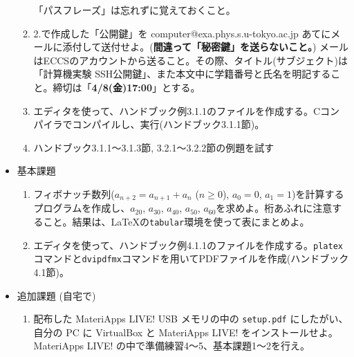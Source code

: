 \documentclass[11pt]{jarticle}
\begin{document}
\begin{itemize}
\begin{enumerate}
    「パスフレーズ」は忘れずに覚えておくこと。
  \item 2.で作成した「公開鍵」を computer@exa.phys.s.u-tokyo.ac.jp あてにメールに添付して送付せよ。({\bf 間違って「秘密鍵」を送らないこと。}) メールはECCSのアカウントから送ること。その際、タイトル(サブジェクト)は「計算機実験 SSH公開鍵」、また本文中に学籍番号と氏名を明記すること。締切は「{\bf 4/8(金)17:00}」とする。
  \item エディタを使って、ハンドブック例3.1.1のファイルを作成する。Cコンパイラでコンパイルし、実行(ハンドブック3.1.1節)。
  \item ハンドブック3.1.1〜3.1.3節, 3.2.1〜3.2.2節の例題を試す
  \end{enumerate}
\item 基本課題
  \begin{enumerate}
  \item フィボナッチ数列($a_{n+2}=a_{n+1}+a_n$ ($n \ge 0$), $a_0=0$, $a_1=1$)を計算するプログラムを作成し、$a_{20}$, $a_{30}$, $a_{40}$, $a_{50}$, $a_{60}$を求めよ。桁あふれに注意すること。結果は、\LaTeX の{\tt tabular}環境を使って表にまとめよ。
  \item エディタを使って、ハンドブック例4.1.1のファイルを作成する。{\tt platex}コマンドと{\tt dvipdfmx}コマンドを用いてPDFファイルを作成(ハンドブック4.1節)。
  \end{enumerate}
\item 追加課題 (自宅で)
  \begin{enumerate}
  \item 配布した MateriApps LIVE! USB メモリの中の {\tt setup.pdf} にしたがい、自分の PC に VirtualBox と MateriApps LIVE! をインストールせよ。MateriApps LIVE! の中で準備練習4〜5、基本課題1〜2を行え。
  \end{enumerate}
\end{itemize}
\end{document}
